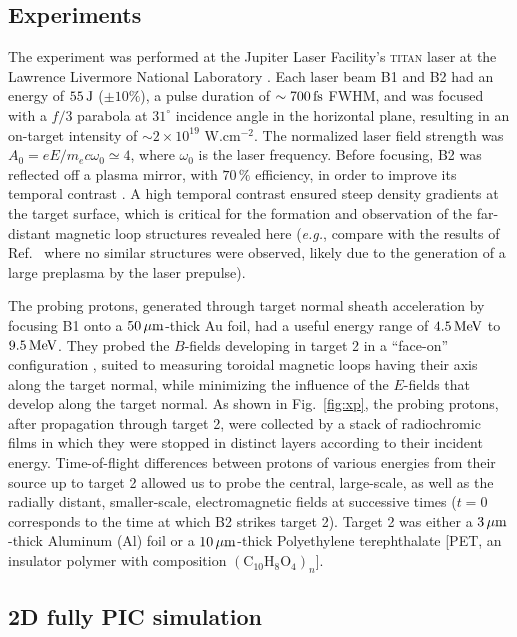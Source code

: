 \documentclass[aps,twocolumn,showpacs,superscriptaddress]{revtex4}
\begin{document}
\subsection*{Experiments}
The experiment 
was performed at the Jupiter Laser Facility's \textsc{titan} laser at the Lawrence Livermore National Laboratory \cite{RSI_Albertazzi_2015}. Each laser beam B1 and B2 had an energy of $55\,\rm J$ ($\pm 10\%$), a pulse duration of $\sim 700\,\rm fs$ FWHM, and was focused with a $f/3$ parabola at $31^\circ$ incidence angle in the horizontal plane, resulting in an on-target intensity of $\sim 2\times 10^{19}$ W.cm$^{-2}$. The normalized laser field strength was $A_0 = eE/m_ec\omega_0 \simeq 4$, where $\omega_0$ is the laser frequency. Before focusing, B2 was reflected off a plasma mirror, with $70\,\%$ efficiency, in order to improve its temporal contrast \cite{PRE_Doumy_2004}. A high temporal contrast ensured steep density gradients at the target surface, which is critical for the formation and observation of the far-distant magnetic loop structures revealed here (\emph{e.g.}, compare with the results of Ref.~\cite{PRL_Sarri_2012} where no similar structures were observed, likely due to the generation of a large preplasma by the laser prepulse). 

The probing protons, generated through target normal sheath acceleration \cite{PRL_Fuchs_2003} by focusing B1 onto a $50\,\rm \mu m$-thick Au foil, had a useful energy range of $4.5\,\rm MeV$ to $9.5\,\rm MeV$. They probed the $B$-fields developing in target 2 in a ``face-on'' configuration \cite{RSI_Albertazzi_2015}, suited to measuring toroidal magnetic loops having their axis along the target normal, while minimizing the influence of the $E$-fields that develop along the target normal. As shown in Fig.~\ref{fig:xp}, the probing protons, after propagation through target 2, were collected by a stack of radiochromic films \cite[]{RSI_Chen_2016} in which they were stopped in distinct layers according to their incident energy. Time-of-flight differences between protons of various energies from their source up to target 2 allowed us to probe the central, large-scale, as well as the radially distant, smaller-scale, electromagnetic fields at successive times ($t=0$ corresponds to the time at which B2 strikes target 2). Target 2 was either a $3\,\rm \mu m$-thick Aluminum (Al) foil or a $10\,\rm \mu m$-thick Polyethylene terephthalate [PET, an insulator polymer with composition $(\mathrm{C}_{10}\mathrm{H}_8\mathrm{O}_4)_n$].
 
\subsection*{2D fully PIC simulation}
\end{document}
